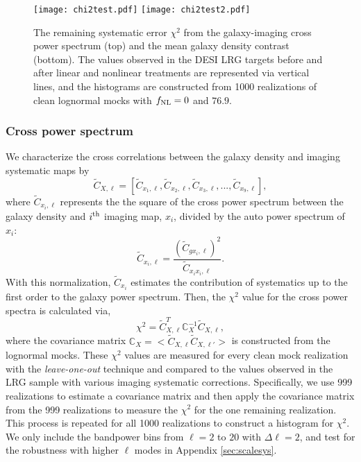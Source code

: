 \begin{figure}
\centering
\texttt{[image: chi2test.pdf]}
\texttt{[image: chi2test2.pdf]}
\caption{The remaining systematic error $\chi^{2}$ from the galaxy-imaging cross power spectrum (top) and the mean galaxy density contrast (bottom). The values observed in the DESI LRG targets before and after linear and nonlinear treatments are represented via vertical lines, and the histograms are constructed from 1000 realizations of clean lognormal mocks with $f_{\rm NL}=0$ and $76.9$.}\label{fig:chi2test}
\end{figure}


\subsubsection{Cross power spectrum}

We characterize the cross correlations between the galaxy density and imaging systematic maps by
\begin{equation}
\tilde{C}_{X, \ell} = [\tilde{C}_{x_{1}, \ell}, \tilde{C}_{x_{2}, \ell}, \tilde{C}_{x_{3}, \ell}, ..., \tilde{C}_{x_{9}, \ell}],
\end{equation}
where $\tilde{C}_{x_{i}, \ell}$ represents the the square of the cross power spectrum between the galaxy density and $i^{\rm th}$ imaging map, $x_{i}$, divided by the auto power spectrum of $x_{i}$:
\begin{equation}
\tilde{C}_{x_{i}, \ell} = \frac{(\tilde{C}_{gx_{i}, \ell})^{2}}{\tilde{C}_{x_{i}x_{i},\ell}}.
\end{equation}
With this normalization, $\tilde{C}_{x_{i}}$ estimates the contribution of systematics up to the first order to the galaxy power spectrum. Then, the $\chi^{2}$ value for the cross power spectra is calculated via,
\begin{equation}
\chi^{2} = \tilde{C}^{T}_{X, \ell} \mathbb{C}_{X}^{-1} \tilde{C}_{X, \ell},
\end{equation}
where the covariance matrix $\mathbb{C}_{X} = < \tilde{C}_{X, \ell} \tilde{C}_{X, \ell'} >$ is constructed from the lognormal mocks. These $\chi^{2}$ values are measured for every clean mock realization with the \textit{leave-one-out} technique and compared to the values observed in the LRG sample with various imaging systematic corrections. Specifically, we use 999 realizations to estimate a covariance matrix and then apply the covariance matrix from the 999 realizations to measure the $\chi^{2}$ for the one remaining realization. This process is repeated for all 1000 realizations to construct a histogram for $\chi^{2}$. We only include the bandpower bins from $\ell=2$ to $20$ with $\Delta\ell=2$, and test for the robustness with higher $\ell$ modes in Appendix \ref{sec:scalesys}. 

